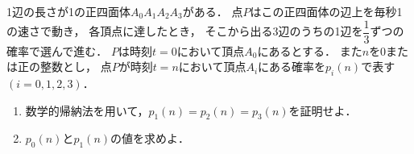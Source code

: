\documentclass[../../main.tex]{subfiles}
\begin{document}
1辺の長さが1の正四面体$A_0A_1A_2A_3$がある．
点$P$はこの正四面体の辺上を毎秒1の速さで動き，
各頂点に達したとき，
そこから出る3辺のうちの1辺を$\displaystyle\dfrac{1}{3}$ずつの確率で選んで進む．
$P$は時刻$t=0$において頂点$A_0$にあるとする．
また$n$を0または正の整数とし，
点$P$が時刻$t=n$において頂点$A_i$にある確率を$p_i(n)$で表す$(i=0,1,2,3)$．
\begin{enumerate}
  \item 数学的帰納法を用いて，$p_1(n)=p_2(n)=p_3(n)$を証明せよ．
  \item $p_0(n)$と$p_1(n)$の値を求めよ．
\end{enumerate}
\end{document}

